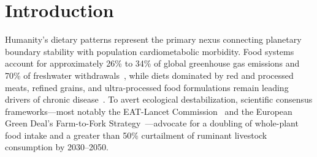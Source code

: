 \documentclass[journal,10pt,twocolumn]{article}
\begin{document}
\section{Introduction}
Humanity's dietary patterns represent the primary nexus connecting planetary boundary stability with population cardiometabolic morbidity. Food systems account for approximately 26\% to 34\% of global greenhouse gas emissions and 70\% of freshwater withdrawals~\cite{poore2018reducing}, while diets dominated by red and processed meats, refined grains, and ultra-processed food formulations remain leading drivers of chronic disease~\cite{willett2019eat, monteiro2019ultra}. To avert ecological destabilization, scientific consensus frameworks—most notably the EAT-Lancet Commission~\cite{willett2019eat} and the European Green Deal’s Farm-to-Fork Strategy~\cite{eu_farm_to_fork2020}—advocate for a doubling of whole-plant food intake and a greater than 50\% curtailment of ruminant livestock consumption by 2030--2050.
\end{document}
